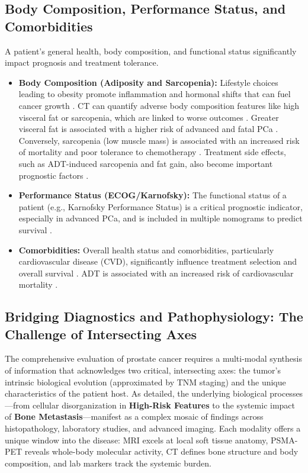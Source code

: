 \documentclass[11pt, a4paper]{article}
\begin{document}
\subsection{Body Composition, Performance Status, and Comorbidities}
A patient's general health, body composition, and functional status significantly impact prognosis and treatment tolerance.
\begin{itemize}
    \item \textbf{Body Composition (Adiposity and Sarcopenia):} Lifestyle choices leading to obesity promote inflammation and hormonal shifts that can fuel cancer growth \cite{UnknownAuthor2017, DickermanTorfadottir2019}. CT can quantify adverse body composition features like high visceral fat or sarcopenia, which are linked to worse outcomes \cite{LeePark2020, GrecoPiccolo2024}. Greater visceral fat is associated with a higher risk of advanced and fatal PCa \cite{WilsonTaaffe2022, DickermanTorfadottir2019}. Conversely, sarcopenia (low muscle mass) is associated with an increased risk of mortality and poor tolerance to chemotherapy \cite{LopezNewton2021, PablosRodrguezPinoSedeo2022}. Treatment side effects, such as ADT-induced sarcopenia and fat gain, also become important prognostic factors \cite{PablosRodrguezPinoSedeo2022, CariolouChristakoudi2024}.
    \item \textbf{Performance Status (ECOG/Karnofsky):} The functional status of a patient (e.g., Karnofsky Performance Status) is a critical prognostic indicator, especially in advanced PCa, and is included in multiple nomograms to predict survival \cite{UnknownAuthor2014}.
    \item \textbf{Comorbidities:} Overall health status and comorbidities, particularly cardiovascular disease (CVD), significantly influence treatment selection and overall survival \cite{HerlemannCowan2024, CooperbergBroering2009}. ADT is associated with an increased risk of cardiovascular mortality \cite{HubanksBoorjian2014, UnknownAuthor2017}.
\end{itemize}

\subsection{Bridging Diagnostics and Pathophysiology: The Challenge of Intersecting Axes}
The comprehensive evaluation of prostate cancer requires a multi-modal synthesis of information that acknowledges two critical, intersecting axes: the tumor's intrinsic biological evolution (approximated by TNM staging) and the unique characteristics of the patient host. As detailed, the underlying biological processes—from cellular disorganization in \textbf{High-Risk Features} to the systemic impact of \textbf{Bone Metastasis}—manifest as a complex mosaic of findings across histopathology, laboratory studies, and advanced imaging. Each modality offers a unique window into the disease: MRI excels at local soft tissue anatomy, PSMA-PET reveals whole-body molecular activity, CT defines bone structure and body composition, and lab markers track the systemic burden.
\end{document}

